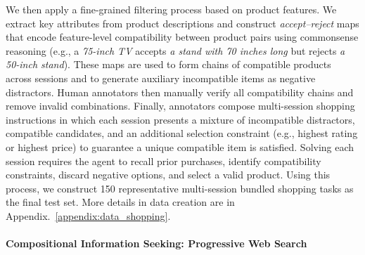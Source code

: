 We then apply a fine-grained filtering process based on product features. We extract key attributes from product descriptions and construct \textit{accept–reject} maps that encode feature-level compatibility between product pairs using commonsense reasoning (e.g., a \textit{75-inch TV} accepts \textit{a stand with 70 inches long} but rejects \textit{a 50-inch stand}). These maps are used to form chains of compatible products across sessions and to generate auxiliary incompatible items as negative distractors. Human annotators then manually verify all compatibility chains and remove invalid combinations. Finally, annotators compose multi-session shopping instructions in which each session presents a mixture of incompatible distractors, compatible candidates, and an additional selection constraint (e.g., highest rating or highest price) to guarantee a unique compatible item is satisfied. Solving each session requires the agent to recall prior purchases, identify compatibility constraints, discard negative options, and select a valid product. Using this process, we construct 150 representative multi-session bundled shopping tasks as the final test set. More details in data creation are in Appendix.~\ref{appendix:data_shopping}.












\paragraph{Compositional Information Seeking: Progressive Web Search}


